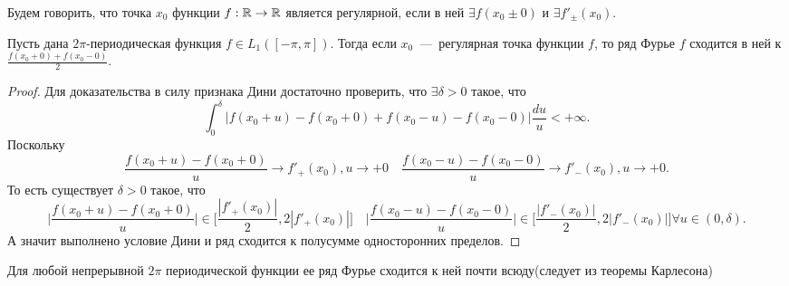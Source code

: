 \begin{definition}
    Будем говорить, что точка $x_0$ функции $f: \mathbb{R} \to \mathbb{R}$ является регулярной, если в ней $\exists f(x_0 \pm 0)$ и $\exists f'_\pm(x_0)$.
\end{definition}
\begin{corollary}
    Пусть дана $2\pi$-периодическая функция $f \in L_1([-\pi, \pi])$. Тогда если $x_0$~---~регулярная точка функции $f$, то ряд Фурье $f$ сходится в ней к $\frac{f(x_0 + 0) + f(x_0 - 0)}{2}$.
\end{corollary}
\begin{proof}
    Для доказательства в силу признака Дини достаточно проверить, что $\exists \delta > 0$ такое, что \[
                                                                                                          \int_0^\delta \bigg|f(x_0 + u) - f(x_0 + 0) + f(x_0 - u) - f(x_0 - 0)\bigg|\dfrac{du}{u} < +\infty.
    \]
    Поскольку \[
                  \dfrac{f(x_0 + u) - f(x_0 + 0)}{u} \rightarrow f'_+(x_0), u \rightarrow +0 \quad  \dfrac{f(x_0 - u) - f(x_0 - 0)}{u} \rightarrow f'_-(x_0), u \rightarrow +0.
    \]
    То есть существует $\delta > 0$ такое, что
    \[
                                                   \biggr|\dfrac{f(x_0 + u) - f(x_0 + 0)}{u}\biggr| \in \biggr[\dfrac{|f'_+(x_0)|}{2}, 2|f'_+(x_0)|\biggr] \quad \biggr|\dfrac{f(x_0 - u) - f(x_0 - 0)}{u}\biggr| \in \biggr[\dfrac{|f'_-(x_0)|}{2}, 2|f'_-(x_0)|\biggr] \forall u \in (0, \delta).
    \]
    А значит выполнено условие Дини и ряд сходится к полусумме односторонних пределов.
\end{proof}

\begin{fact}
        Для любой непрерывной $2\pi$ периодической функции ее ряд Фурье сходится к ней почти всюду(следует из теоремы Карлесона)
\end{fact}



